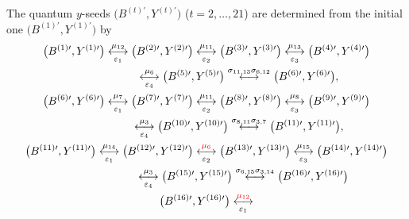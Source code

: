 \documentclass[11pt]{article}
\numberwithin{equation}{section}
\newcommand\bY{Y}
\numberwithin{equation}{section}
\begin{document}
The quantum $y$-seeds $\bigl(B^{(t)\prime}, Y^{(t)\prime}\bigr)$
($t=2, \dots, 21$) are determined from the initial one
$\bigl(B^{(1)\prime},\allowbreak Y^{(1)\prime}\bigr)$ by
\begin{gather}
\bigl(B^{(1)\prime}, \bY^{(1)\prime}\bigr) \underset{\varepsilon_1}{\overset{\mu_{12}}{\longleftrightarrow}}
\bigl(B^{(2)\prime}, \bY^{(2)\prime}\bigr) \underset{\varepsilon_2}{\overset{\mu_{11}}{\longleftrightarrow}}
\bigl(B^{(3)\prime}, \bY^{(3)\prime}\bigr) \underset{\varepsilon_3}{\overset{\mu_{13}}{\longleftrightarrow}}
\bigl(B^{(4)\prime}, \bY^{(4)\prime}\bigr)\nonumber
\\
\phantom{\bigl(B^{(1)\prime}, \bY^{(1)\prime}\bigr) }{}
\underset{\varepsilon_4}{\overset{\mu_{6}}{\longleftrightarrow}}
\bigl(B^{(5)\prime}, \bY^{(5)\prime}\bigr) \overset{\sigma_{11,13}\sigma_{6,12}}{\longleftrightarrow}
\bigl(B^{(6)\prime}, \bY^{(6)\prime}\bigr),\nonumber
\\
\bigl(B^{(6)\prime}, \bY^{(6)\prime}\bigr) \underset{\varepsilon_1}{\overset{\mu_{7}}{\longleftrightarrow}}
\bigl(B^{(7)\prime}, \bY^{(7)\prime}\bigr) \underset{\varepsilon_2}{\overset{\mu_{11}}{\longleftrightarrow}}
\bigl(B^{(8)\prime}, \bY^{(8)\prime}\bigr) \underset{\varepsilon_3}{\overset{\mu_{8}}{\longleftrightarrow}}
\bigl(B^{(9)\prime}, \bY^{(9)\prime}\bigr)\nonumber
\\
\phantom{\bigl(B^{(6)\prime}, \bY^{(6)\prime}\bigr)}{}
\underset{\varepsilon_4}{\overset{\mu_{3}}{\longleftrightarrow}}
\bigl(B^{(10)\prime}, \bY^{(10)\prime}\bigr) \overset{\sigma_{8,11}\sigma_{3,7}}{\longleftrightarrow}
\bigl(B^{(11)\prime}, \bY^{(11)\prime}\bigr),\nonumber
\\
\bigl(B^{(11)\prime}, \bY^{(11)\prime}\bigr) \underset{\varepsilon_1}{\overset{\mu_{14}}{\longleftrightarrow}}
\bigl(B^{(12)\prime}, \bY^{(12)\prime}\bigr) \underset{\varepsilon_2}{\overset{\begin{color}{red}\mu_{6}\end{color}}{\longleftrightarrow}}
\bigl(B^{(13)\prime}, \bY^{(13)\prime}\bigr) \underset{\varepsilon_3}{\overset{\mu_{15}}{\longleftrightarrow}}
\bigl(B^{(14)\prime}, \bY^{(14)\prime}\bigr)\nonumber
\\
\phantom{\bigl(B^{(11)\prime}, \bY^{(11)\prime}\bigr)}{}
\underset{\varepsilon_4}{\overset{\mu_{3}}{\longleftrightarrow}}
\bigl(B^{(15)\prime}, \bY^{(15)\prime}\bigr) \overset{\sigma_{6,15}\sigma_{3,14}}{\longleftrightarrow}
\bigl(B^{(16)\prime}, \bY^{(16)\prime}\bigr)\nonumber
\\
\bigl(B^{(16)\prime}, \bY^{(16)\prime}\bigr) \underset{\varepsilon_1}{\overset{\begin{color}{red}\mu_{12}\end{color}}{\longleftrightarrow} }

\end{gather}
\end{document}
